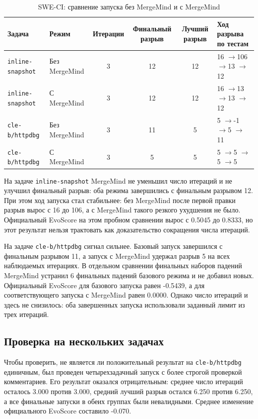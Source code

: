 \documentclass[12pt,a4paper]{article}
\newcommand{\gap}{$\to$}
\begin{document}
\begin{table}[h]
\centering
\small
\caption{SWE-CI: сравнение запуска без MergeMind и с MergeMind}
\label{tab:positive}
\begin{tabularx}{\textwidth}{@{}Y Y c c c Y@{}}
\toprule
Задача & Режим & Итерации & Финальный разрыв & Лучший разрыв & Ход разрыва по тестам \\
\midrule
\texttt{inline-snapshot} & Без MergeMind & 3 & 12 & 12 & 16 \gap 106 \gap 13 \gap 12 \\
\texttt{inline-snapshot} & С MergeMind & 3 & 12 & 12 & 16 \gap 13 \gap 13 \gap 12 \\
\addlinespace
\texttt{cle-b/httpdbg} & Без MergeMind & 3 & 11 & 5 & 5 \gap -1 \gap 5 \gap 11 \\
\texttt{cle-b/httpdbg} & С MergeMind & 3 & 5 & 5 & 5 \gap 5 \gap 5 \gap 5 \\
\bottomrule
\end{tabularx}
\end{table}

На задаче \texttt{inline-snapshot} MergeMind не уменьшил число итераций и не
улучшил финальный разрыв: оба режима завершились с финальным разрывом 12.
При этом ход запуска стал стабильнее: без MergeMind после первой правки разрыв
вырос с 16 до 106, а с MergeMind такого резкого ухудшения не было. Официальный
EvoScore на этом пробном сравнении вырос с 0.5045 до 0.8333, но этот результат
нельзя трактовать как доказательство сокращения числа итераций.

На задаче \texttt{cle-b/httpdbg} сигнал сильнее. Базовый запуск завершился с
финальным разрывом 11, а запуск с MergeMind удержал разрыв 5 на всех
наблюдаемых итерациях. В отдельном сравнении финальных наборов падений
MergeMind устранил 6 финальных падений базового режима и не добавил новых.
Официальный EvoScore для базового запуска равен -0.5439, а для соответствующего
запуска с MergeMind равен 0.0000. Однако число итераций и здесь не снизилось:
оба завершенных запуска использовали заданный лимит из трех итераций.

\subsection{Проверка на нескольких задачах}

Чтобы проверить, не является ли положительный результат на
\texttt{cle-b/httpdbg} единичным, был проведен четырехзадачный запуск с более
строгой проверкой комментариев. Его результат оказался отрицательным:
среднее число итераций осталось 3.000 против 3.000, средний лучший разрыв
остался 6.250 против 6.250, а все финальные запуски в обеих группах были
невалидными. Среднее изменение официального EvoScore составило -0.070.
\end{document}
